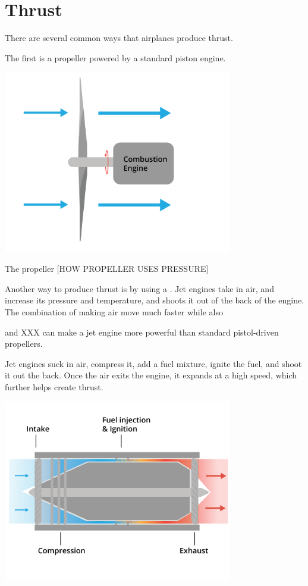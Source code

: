 \section{Thrust}

There are several common ways that airplanes produce thrust.

The first is a propeller powered by a standard piston engine.

\includegraphics[width=0.75\textwidth]{propeller.png}

The propeller [HOW PROPELLER USES PRESSURE]


Another way to produce thrust is by using a . Jet engines take in air, and increase its pressure and temperature, and shoots it out of the back of the engine. The combination of making air move much faster while also 

and XXX can make a jet engine more powerful than standard pistol-driven propellers. 


Jet engines suck in air, compress it, add a fuel mixture, ignite the fuel, and shoot it out the back. Once the air exits the engine, it expands at a high speed, which further helps create thrust. 




\includegraphics[width=0.75\textwidth]{jet.png}



